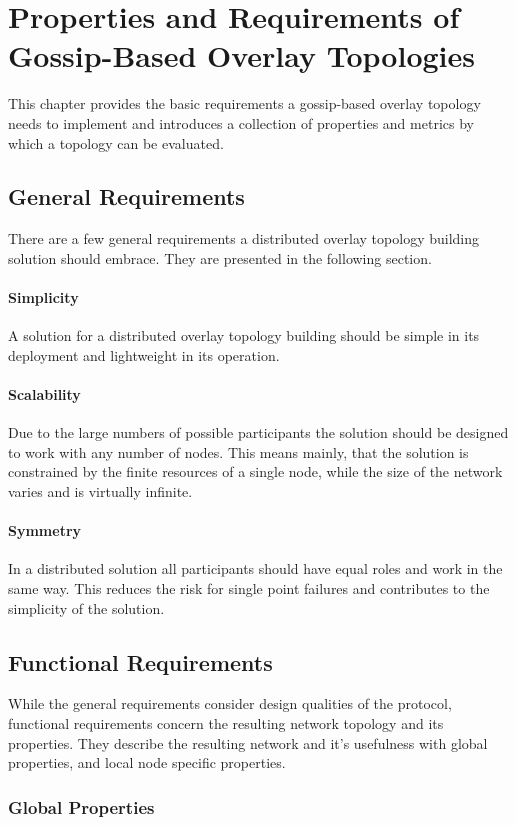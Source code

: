 \chapter{Properties and Requirements of Gossip-Based Overlay Topologies} 
\label{chap:properties}
This chapter provides the basic requirements a gossip-based overlay topology
needs to implement and introduces a collection of properties and metrics by
which a topology can be evaluated. \cite{bakhshi2007formal}
\section{General Requirements}
There are a few general requirements a distributed overlay topology building
solution should embrace. They are presented in the following section.
\subsubsection{Simplicity}
A solution for a distributed overlay topology building should be simple in its
deployment and lightweight in its operation. 
\subsubsection{Scalability}
Due to the large numbers of possible participants the solution should be
designed to work with any number of nodes. This means mainly, that the solution
is constrained by the finite resources of a single node, while the size of the
network varies and is virtually infinite.

\subsubsection{Symmetry}
In a distributed solution all participants should have equal roles and work in
the same way. This reduces the risk for single point failures and contributes to
the simplicity of the solution.

\section{Functional Requirements}
While the general requirements consider design qualities of the protocol,
functional requirements concern the resulting network topology and its
properties. They describe the resulting network and it’s usefulness with global
properties, and local node specific properties.

\subsection{Global Properties}

